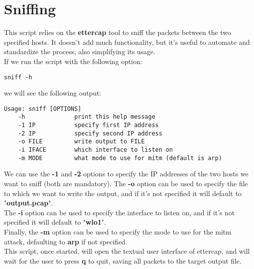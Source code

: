 \section{Sniffing}
This script relies on the \textbf{ettercap} tool to sniff the packets between the two specified
hosts. It doesn't add much functionality, but it's useful to automate
and standardize the process, also simplifying its usage.\\
If we run the script with the following option:
\begin{lstlisting}[numbers=none]
    sniff -h
\end{lstlisting}
we will see the following output:
\begin{lstlisting}[numbers=none]
    Usage: sniff [OPTIONS]
    -h              print this help message
    -1 IP           specify first IP address
    -2 IP           specify second IP address
    -o FILE         write output to FILE
    -i IFACE        which interface to listen on
    -m MODE         what mode to use for mitm (default is arp)
\end{lstlisting}
We can use the \textbf{-1} and \textbf{-2} options to specify the IP addresses of the
two hosts we want to sniff (both are mandatory). The \textbf{-o} option can be used
to specify the file to which we want to write the output, and if it's not specified
it will default to "\textbf{output.pcap}".\\
The \textbf{-i} option can be used to specify the interface to listen on, and if it's
not specified it will default to "\textbf{wlo1}".\\
Finally, the \textbf{-m} option can be used to specify the mode to use for the mitm
attack, defaulting to \textbf{arp} if not specified.\\
This script, once started, will open the textual user interface of ettercap,
and will wait for the user to press \textbf{q} to quit, saving all packets
to the target output file.\\
\newpage